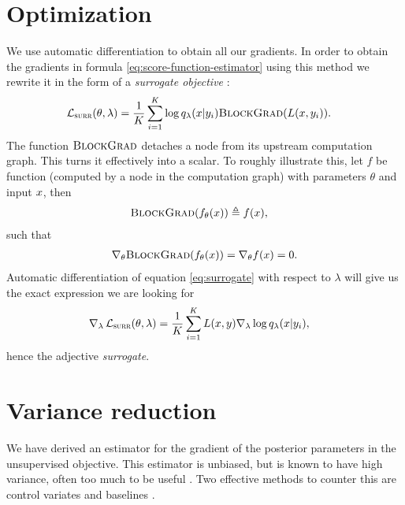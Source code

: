 \section{Optimization}
We use automatic differentiation \citep{baydin2017automatic} to obtain all our gradients. In order to obtain the gradients in formula \ref{eq:score-function-estimator} using this method we rewrite it in the form of a \textit{surrogate objective} \citep{schulman2015gradient}:
\begin{align}
  \label{eq:surrogate}
  \operatorname{\mathcal{L}}_{ \textsc{surr} }(\theta, \lambda) &= \frac{1}{K}\sum_{i=1}^K \log q_{\lambda}(x | y_i) \textsc{BlockGrad}( L(x, y_i) ).
\end{align}
The function $\textsc{BlockGrad}$ detaches a node from its upstream computation graph. This turns it effectively into a scalar. To roughly illustrate this, let $f$ be function (computed by a node in the computation graph) with parameters $\theta$ and input $x$, then
\begin{align*}
  \textsc{BlockGrad}(f_{\theta}( x )) &\triangleq f( x ),
\end{align*}
such that
\begin{align*}
  \nabla_{\theta}\textsc{BlockGrad}(f_{\theta}( x )) = \nabla_{\theta} f( x ) = 0.
\end{align*}
Automatic differentiation of equation \ref{eq:surrogate} with respect to $\lambda$ will give us the exact expression we are looking for
\begin{align*}
  \nabla_{\lambda} \operatorname{\mathcal{L}}_{ \textsc{surr} }(\theta, \lambda) &= \frac{1}{K}\sum_{i=1}^K L(x, y) \nabla_{\lambda} \log q_{\lambda}( x | y_i ),
\end{align*}
hence the adjective \textit{surrogate}.

\section{Variance reduction}
We have derived an estimator for the gradient of the posterior parameters in the unsupervised objective. This estimator is unbiased, but is known to have high variance, often too much to be useful \citep{paisley2012viss}. Two effective methods to counter this are control variates and baselines \citep{ross2006simulation}.

